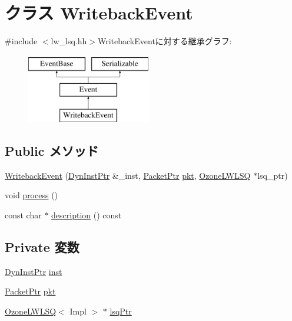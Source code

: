 \hypertarget{classOzoneLWLSQ_1_1WritebackEvent}{
\section{クラス WritebackEvent}
\label{classOzoneLWLSQ_1_1WritebackEvent}
}


{\ttfamily \#include $<$lw\_\-lsq.hh$>$}WritebackEventに対する継承グラフ:\begin{figure}[H]
\begin{center}
\leavevmode
\includegraphics[height=3cm]{classOzoneLWLSQ_1_1WritebackEvent}
\end{center}
\end{figure}
\subsection*{Public メソッド}
\begin{DoxyCompactItemize}
\item 
\hyperlink{classOzoneLWLSQ_1_1WritebackEvent_a4de731bd611fafa473682bcfce09134c}{WritebackEvent} (\hyperlink{classOzoneLWLSQ_a028ce10889c5f6450239d9e9a7347976}{DynInstPtr} \&\_\-inst, \hyperlink{classPacket}{PacketPtr} \hyperlink{classOzoneLWLSQ_1_1WritebackEvent_a3a891bc2a0fcbe6be5297077d94e2df7}{pkt}, \hyperlink{classOzoneLWLSQ}{OzoneLWLSQ} $\ast$lsq\_\-ptr)
\item 
void \hyperlink{classOzoneLWLSQ_1_1WritebackEvent_a2e9c5136d19b1a95fc427e0852deab5c}{process} ()
\item 
const char $\ast$ \hyperlink{classOzoneLWLSQ_1_1WritebackEvent_a5a14fe478e2393ff51f02e9b7be27e00}{description} () const 
\end{DoxyCompactItemize}
\subsection*{Private 変数}
\begin{DoxyCompactItemize}
\item 
\hyperlink{classOzoneLWLSQ_a028ce10889c5f6450239d9e9a7347976}{DynInstPtr} \hyperlink{classOzoneLWLSQ_1_1WritebackEvent_af5d4fb974eeb4507d4c837d365d0cefc}{inst}
\item 
\hyperlink{classPacket}{PacketPtr} \hyperlink{classOzoneLWLSQ_1_1WritebackEvent_a3a891bc2a0fcbe6be5297077d94e2df7}{pkt}
\item 
\hyperlink{classOzoneLWLSQ}{OzoneLWLSQ}$<$ Impl $>$ $\ast$ \hyperlink{classOzoneLWLSQ_1_1WritebackEvent_a12f06bf70a86210f1df02ebe1b6d4d1a}{lsqPtr}
\end{DoxyCompactItemize}


